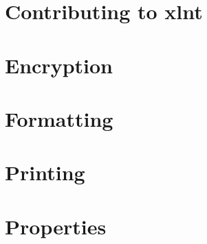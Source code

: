 \let\mypdfximage\pdfximage\def\pdfximage{\immediate\mypdfximage}\documentclass[twoside]{book}
\newcommand{\+}{\discretionary{\mbox{\scriptsize$\hookleftarrow$}}{}{}}
\begin{document}
\chapter{Contributing to xlnt}
\label{md__c___users_nouet__documents__cours_5_a__dev__p_r_d__prd_coprod__prd_coprod_libs_xlnt_1_5_0__c_o_n_t_r_i_b_u_t_i_n_g}

\chapter{Encryption}
\label{md__c___users_nouet__documents__cours_5_a__dev__p_r_d__prd_coprod__prd_coprod_libs_xlnt_1_5_0_docs_advanced__encryption}

\chapter{Formatting}
\label{md__c___users_nouet__documents__cours_5_a__dev__p_r_d__prd_coprod__prd_coprod_libs_xlnt_1_5_0_docs_advanced__formatting}

\chapter{Printing}
\label{md__c___users_nouet__documents__cours_5_a__dev__p_r_d__prd_coprod__prd_coprod_libs_xlnt_1_5_0_docs_advanced__printing}

\chapter{Properties}
\label{md__c___users_nouet__documents__cours_5_a__dev__p_r_d__prd_coprod__prd_coprod_libs_xlnt_1_5_0_docs_advanced__properties}

\end{document}
